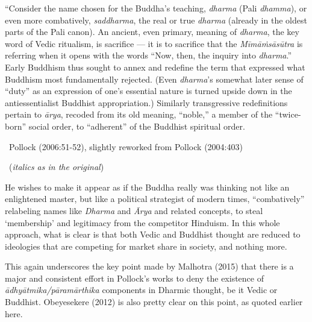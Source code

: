 \begin{myquote}
“Consider the name chosen for the Buddha’s teaching, \textit{dharma} (Pali \textit{dhamma}), or even more combatively, \textit{saddharma}, the real or true \textit{dharma} (already in the oldest parts of the Pali canon). An ancient, even primary, meaning of \textit{dharma}, the key word of Vedic ritualism, is sacriﬁce — it is to sacriﬁce that the \textit{Mīmāṁsāsūtra} is referring when it opens with the words “Now, then, the inquiry into \textit{dharma}.” Early Buddhism thus sought to annex and redeﬁne the term that expressed what Buddhism most fundamentally rejected. (Even \textit{dharma}’s somewhat later sense of “duty” as an expression of one’s essential nature is turned upside down in the antiessentialist Buddhist appropriation.) Similarly transgressive redeﬁnitions pertain to \textit{ārya}, recoded from its old meaning, “noble,” a member of the “twice-born” social order, to “adherent” of the Buddhist spiritual order. 

~\hfill Pollock (2006:51-52), slightly reworked from Pollock (2004:403)
\end{myquote}

\begin{myquote}

~\hfill (\textit{italics as in the original})
\end{myquote}

He wishes to make it appear as if the Buddha really was thinking not like an enlightened master, but like a political strategist of modern times, “combatively” relabeling names like \textit{Dharma} and \textit{Ārya} and related concepts, to steal ‘membership’ and legitimacy from the competitor Hinduism. In this whole approach, what is clear is that both Vedic and Buddhist thought are reduced to ideologies that are competing for market share in society, and nothing more.

This again underscores the key point made by Malhotra (2015) that there is a major and consistent effort in Pollock’s works to deny the existence of \textit{ādhyātmika/pāramārthika} components in Dharmic thought, be it Vedic or Buddhist. Obeyesekere (2012) is also pretty clear on this point, as quoted earlier here.



